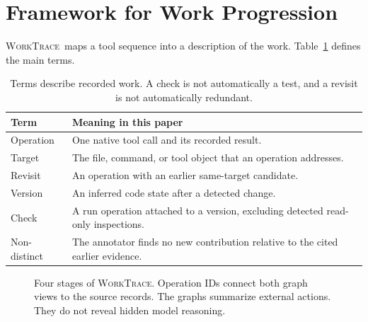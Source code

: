 \documentclass[10pt,a4paper,twocolumn]{article}
\newcommand{\wt}{\textsc{WorkTrace}}
\begin{document}
\section{Framework for Work Progression}
\wt\ maps a tool sequence into a description of the work. Table~\ref{tab:terms} defines the main terms.
\begin{table}[t]
\centering\small
\begin{tabular}{p{}p{}}
\toprule
Term & Meaning in this paper\\
\midrule
Operation & One native tool call and its recorded result.\\
Target & The file, command, or tool object that an operation addresses.\\
Revisit & An operation with an earlier same-target candidate.\\
Version & An inferred code state after a detected change.\\
Check & A run operation attached to a version, excluding detected read-only inspections.\\
Non-distinct & The annotator finds no new contribution relative to the cited earlier evidence.\\
\bottomrule
\end{tabular}
\caption{Terms describe recorded work. A check is not automatically a test, and a revisit is not automatically redundant.}
\label{tab:terms}
\end{table}
\begin{figure}[t]
\centering
{}
\caption{Four stages of \wt. Operation IDs connect both graph views to the source records. The graphs summarize external actions. They do not reveal hidden model reasoning.}
\label{fig:pipeline}
\end{figure}
\end{document}
